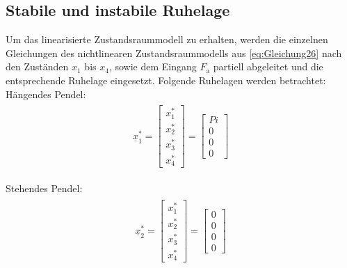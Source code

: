 \documentclass[
	pagesize,
	fontsize=12pt,
	paper=a4,
	oneside,
   reqno
]{scrartcl}
\begin{document}
\subsection{Stabile und instabile Ruhelage}
Um das linearisierte Zustandsraummodell zu erhalten, werden die einzelnen Gleichungen des nichtlinearen Zustandsraummodells aus \autoref{eq:Gleichung26} nach den Zuständen $x_{\mathrm{1}}$ bis $x_{\mathrm{4}}$, sowie dem Eingang $F_{\mathrm{a}}$ partiell abgeleitet und die entsprechende Ruhelage eingesetzt. Folgende Ruhelagen werden betrachtet:\\
Hängendes Pendel:
\begin{align}\label{eq:Gleichung30}
    \begin{split}
        \underline{x}_{\mathrm{1}}^{*}=
        \begin{bmatrix}
            x_{\mathrm{1}}^{*}\\
            x_{\mathrm{2}}^{*}\\
            x_{\mathrm{3}}^{*}\\
            x_{\mathrm{4}}^{*}
        \end{bmatrix}=
        \begin{bmatrix}
            Pi\\
            0\\
            0\\
            0
        \end{bmatrix}
    \end{split}
\end{align}

Stehendes Pendel:
\begin{align}\label{eq:Gleichung31}
    \begin{split}
        \underline{x}_{\mathrm{2}}^{*}=
        \begin{bmatrix}
            x_{\mathrm{1}}^{*}\\
            x_{\mathrm{2}}^{*}\\
            x_{\mathrm{3}}^{*}\\
            x_{\mathrm{4}}^{*}
        \end{bmatrix}=
        \begin{bmatrix}
            0\\
            0\\
            0\\
            0
        \end{bmatrix}
    \end{split}
\end{align}
\end{document}

